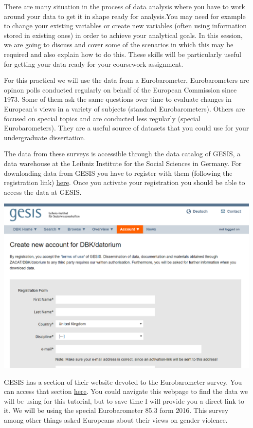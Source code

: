 \documentclass[]{book}
\theoremstyle{definition}
\theoremstyle{definition}
\theoremstyle{definition}
\theoremstyle{remark}
\begin{document}
There are many situation in the process of data analysis where you have
to work around your data to get it in shape ready for analysis.You may
need for example to change your existing variables or create new
variables (often using information stored in existing ones) in order to
achieve your analytical goals. In this session, we are going to discuss
and cover some of the scenarios in which this may be required and also
explain how to do this. These skills will be particularly useful for
getting your data ready for your coursework assignment.

For this practical we will use the data from a Eurobarometer.
Eurobarometers are opinon polls conducted regularly on behalf of the
European Commission since 1973. Some of them ask the same questions over
time to evaluate changes in European's views in a variety of subjects
(standard Eurobarometers). Others are focused on special topics and are
conducted less regularly (special Eurobarometers). They are a useful
source of datasets that you could use for your undergraduate
dissertation.

The data from these surveys is accessible through the data catalog of
GESIS, a data warehouse at the Leibniz Institute for the Social Sciences
in Germany. For downloading data from GESIS you have to register with
them (following the registration link)
\href{https://dbk.gesis.org/dbksearch/register.asp}{here}. Once you
activate your registration you should be able to access the data at
GESIS.

\includegraphics{imgs/register.PNG}

GESIS has a section of their website devoted to the Eurobarometer
survey. You can access that section
\href{https://www.gesis.org/eurobarometer-data-service/home/}{here}. You
could navigate this webpage to find the data we will be using for this
tutorial, but to save time I will provide you a direct link to it. We
will be using the special Eurobarometer 85.3 form 2016. This survey
among other things asked Europeans about their views on gender violence.
\end{document}
